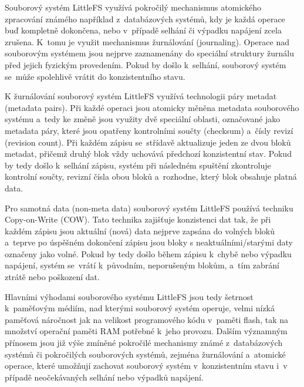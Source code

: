 
Souborový systém LittleFS využívá pokročilý mechanismus atomického zpracování známého například z~databázových systémů, kdy je každá operace buď kompletně dokončena, nebo v~případě selhání či výpadku napájení zcela zrušena. K~tomu je využit mechanismus žurnálování (journaling). Operace nad souborovým systémem jsou nejprve zaznamenány do speciální struktury žurnálu před jejich fyzickým provedením. Pokud by došlo k~selhání, souborový systém se~může spolehlivě vrátit do konzistentního stavu.~\cite{nxp_the_design_of_the_little_filesystem}

K žurnálování souborový systém LittleFS využívá technologii páry metadat (metadata pairs). Při každé operaci jsou atomicky měněna metadata souborového systému a~tedy ke změně jsou využity dvě speciální oblasti, označované jako metadata páry, které jsou opatřeny kontrolními součty (checksum) a~čísly revizí (revision count). Při každém zápisu se~střídavě aktualizuje jeden ze dvou bloků metadat, přičemž druhý blok vždy uchovává předchozí konzistentní stav. Pokud by tedy došlo k~selhání zápisu, systém při následném spuštění zkontroluje kontrolní součty, revizní čísla obou bloků a~rozhodne, který blok obsahuje platná data.~\cite{nxp_the_design_of_the_little_filesystem}

Pro samotná data (non-meta data) souborový systém LittleFS používá techniku Copy-on-Write (COW). Tato technika zajišťuje konzistenci dat tak, že při každém zápisu jsou aktuální (nová) data nejprve zapsána do volných bloků a~teprve po úspěšném dokončení zápisu jsou bloky s neaktuálními/starými daty označeny jako volné. Pokud by tedy došlo během zápisu k~chybě nebo výpadku napájení, systém se~vrátí k~původním, neporušeným blokům, a~tím zabrání ztrátě nebo poškození dat.~\cite{nxp_the_design_of_the_little_filesystem}

Hlavními výhodami souborového systému LittleFS jsou tedy šetrnost k~paměťovým médiím, nad kterými souborový systém operuje, velmi nízká paměťová náročnost jak na velikost programového kódu v~paměti flash, tak na množství operační paměti RAM potřebné k~jeho provozu. Dalším významným přínosem jsou již výše zmíněné pokročilé mechanismy známé z~databázových systémů či pokročilých souborových systémů, zejména žurnálování a~atomické operace, které umožňují zachovat souborový systém v~konzistentním stavu i~v případě neočekávaných selhání nebo výpadků napájení.~\cite{nxp_the_design_of_the_little_filesystem}


